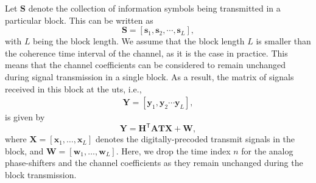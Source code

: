 \documentclass[12pt,draftclsnofoot,onecolumn,journal]{IEEEtran}
\newcommand{\dbc}[1]{ \left[ #1 \right] }
\newcommand{\trp}{\mathsf{T}}
\begin{document}
Let $\mathbf S$ denote the collection of information symbols being transmitted in a particular block. This can be written as 
\begin{equation}
	\mathbf S=\left[ \mathbf s_1, \mathbf s_2, \cdots,  \mathbf s_L\right] ,
\end{equation}
with $L$ being the block length. %
We assume that the block length $L$ is smaller than the coherence time interval of the channel, as it is the case in practice. This means that the channel coefficients can be considered to remain unchanged during signal transmission in a single block. As a result, the matrix of signals received in this block at the \acp{ut}, i.e., 
\begin{align}
	\mathbf Y=\left[ \mathbf y_1, \mathbf y_2 \cdots  \mathbf y_L\right],
\end{align}
is given by
 \begin{equation}
	\mathbf Y=\mathbf{H}^\trp \mathbf{A} \mathbf{T} \mathbf{X}+\mathbf{W}, 
\end{equation}
where $\mathbf{X}=\dbc{\mathbf x_1,  \dots, \mathbf x_L }$ denotes the digitally-precoded transmit signals in the block, and $\mathbf{W}=\dbc{\mathbf w_1,  \dots, \mathbf w_L }$. Here, we drop the time index $n$ for the analog phase-shifters and the channel coefficients as they remain unchanged during the block transmission.
\end{document}
